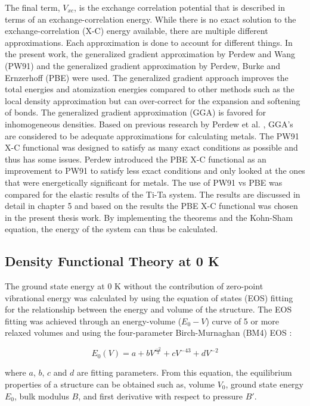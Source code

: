 \noindent The final term, $V_{xc}$, is the exchange correlation potential that is described in terms of an exchange-correlation energy. While there is no exact solution to the exchange-correlation (X-C) energy available, there are multiple different approximations. Each approximation is done to account for different things. In the present work, the generalized gradient approximation by Perdew and Wang (PW91) \cite{Perdew1992} and the generalized gradient approximation by Perdew, Burke and Ernzerhoff (PBE) \cite{Perdew1996a} were used. The generalized gradient approach improves the total energies and atomization energies compared to other methods such as the local density approximation \cite{Ceperley1980} but can over-correct for the expansion and softening of bonds. The generalized gradient approximation (GGA) is favored for inhomogeneous densities. Based on previous research by Perdew et al. \cite{Perdew1996a}, GGA's are considered to be adequate approximations for calculating metals. The PW91 X-C functional was designed to satisfy as many exact conditions as possible and thus has some issues. Perdew introduced the PBE X-C functional as an improvement to PW91 to satisfy less exact conditions and only looked at the ones that were energetically significant for metals. The use of PW91 vs PBE was compared for the elastic results of the Ti-Ta system. The results are discussed in detail in chapter 5 and based on the results the PBE X-C functional was chosen in the present thesis work. By implementing the theorems and the Kohn-Sham equation, the energy of the system can thus be calculated.

\subsection{Density Functional Theory at 0 K}

The ground state energy at 0 K without the contribution of zero-point vibrational energy was calculated by using the equation of states (EOS) fitting for the relationship between the energy and volume of the structure. The EOS fitting was achieved through an energy-volume ($E_{0}-V$) curve of 5 or more relaxed volumes and using the four-parameter Birch-Murnaghan (BM4) EOS \cite{Shang2010}:

\begin{equation}
\label{eq: zeroenergy}
E_{0}(V) = a + bV^{\frac{-2}{3}} + cV^{{-4}{3}} + dV^{-2}
\end{equation}

\noindent where $a$, $b$, $c$ and $d$ are fitting parameters. From this equation, the equilibrium properties of a structure can be obtained such as, volume $V_0$, ground state energy $E_{0}$, bulk modulus $B$, and first derivative with respect to pressure $B'$. 

